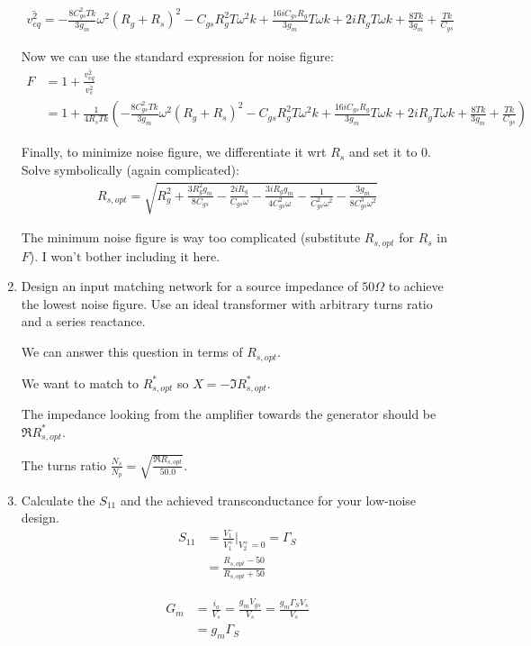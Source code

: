 \begin{enumerate}[label=(\alph*)]
    \begin{align*}
        \overline{v_{eq}^2} = - \frac{8 C_{gs}^{2} T k}{3 g_{m}} \omega^{2} \left(R_{g} + R_{s}\right)^{2} - C_{gs} R_{g}^{2} T \omega^{2} k + \frac{16 i C_{gs} R_{g}}{3 g_{m}} T \omega k + 2 i R_{g} T \omega k + \frac{8 T k}{3 g_{m}} + \frac{T k}{C_{gs}}
    \end{align*}

    Now we can use the standard expression for noise figure:
    \begin{align*}
        F &= 1 + \frac{\overline{v_{eq}^2}}{\overline{v_s^2}} \\
        &= 1 + \frac{1}{4 R_{s} T k} \left(- \frac{8 C_{gs}^{2} T k}{3 g_{m}} \omega^{2} \left(R_{g} + R_{s}\right)^{2} - C_{gs} R_{g}^{2} T \omega^{2} k + \frac{16 i C_{gs} R_{g}}{3 g_{m}} T \omega k + 2 i R_{g} T \omega k + \frac{8 T k}{3 g_{m}} + \frac{T k}{C_{gs}}\right)
    \end{align*}

    Finally, to minimize noise figure, we differentiate it wrt $R_s$ and set it to 0. Solve symbolically (again complicated):
    \begin{align*}
        R_{s,opt} = \sqrt{R_{g}^{2} + \frac{3 R_{g}^{2} g_{m}}{8 C_{gs}} - \frac{2 i R_{g}}{C_{gs} \omega} - \frac{3 i R_{g} g_{m}}{4 C_{gs}^{2} \omega} - \frac{1}{C_{gs}^{2} \omega^{2}} - \frac{3 g_{m}}{8 C_{gs}^{3} \omega^{2}}}
    \end{align*}

    The minimum noise figure is way too complicated (substitute $R_{s,opt}$ for $R_s$ in $F$). I won't bother including it here.

    \item {\color{blue} Design an input matching network for a source impedance of $50\Omega$ to achieve the lowest noise figure. Use an ideal transformer with arbitrary turns ratio and a series reactance.}

    We can answer this question in terms of $R_{s,opt}$.

    We want to match to $R_{s,opt}^*$ so $X = -\Im{R_{s,opt}^*}$.

    The impedance looking from the amplifier towards the generator should be $\Re{R_{s,opt}^*}$.

    The turns ratio $\frac{N_s}{N_p} = \sqrt{\frac{\Re{R_{s,opt}}}{50.0}}$.

    \item {\color{blue} Calculate the $S_{11}$ and the achieved transconductance for your low-noise design.}
    \begin{align*}
        S_{11} &= \frac{V_1^-}{V_1^+} \rvert_{V_2^+ = 0} = \Gamma_S \\
        &= \frac{R_{s,opt} - 50}{R_{s,opt} + 50}
    \end{align*}

    \begin{align*}
        G_m &= \frac{i_o}{V_s} = \frac{g_m V_{gs}}{V_s} = \frac{g_m \Gamma_S V_s}{V_s} \\
        &= g_m \Gamma_S
    \end{align*}
\end{enumerate}

